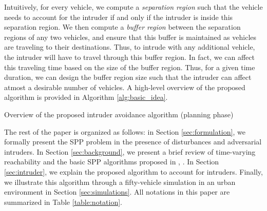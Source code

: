 Intuitively, for every vehicle, we compute a \textit{separation region} such that the vehicle needs to account for the intruder if and only if the intruder is inside this separation region. We then compute a \textit{buffer region} between the separation regions of any two vehicles, and ensure that this buffer is maintained as vehicles are traveling to their destinations. Thus, to intrude with any additional vehicle, the intruder will have to travel through this buffer region. In fact, we can affect this traveling time based on the size of the buffer region. Thus, for a given time duration, we can design the buffer region size such that the intruder can affect atmost a desirable number of vehicles. A high-level overview of the proposed algorithm is provided in Algorithm \ref{alg:basic_idea}.    
%
\begin{algorithm}[tb]
	\DontPrintSemicolon
	\caption{Overview of the proposed intruder avoidance algorithm (planning phase)}
	\label{alg:basic_idea}
\end{algorithm}
%

The rest of the paper is organized as follows: in Section \ref{sec:formulation}, we formally present the SPP problem in the presence of disturbances and adversarial intruders. In Section \ref{sec:background}, we present a brief review of time-varying reachability and the basic SPP algorithms proposed in \cite{Chen15c}, \cite{Bansal2017}. In Section \ref{sec:intruder}, we explain the proposed algorithm to account for intruders. Finally, we illustrate this algorithm through a fifty-vehicle simulation in an urban environment in Section \ref{sec:simulations}. All notations in this paper are summarized in Table \ref{table:notation}.